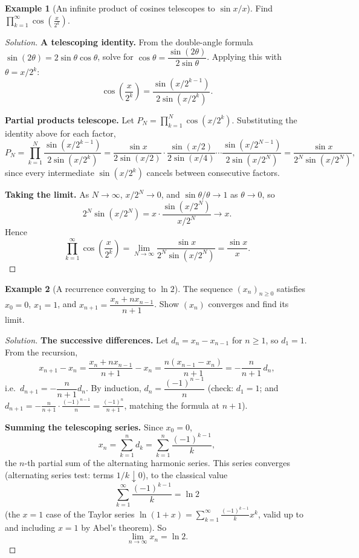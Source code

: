 \documentclass[11pt]{article}
\theoremstyle{definition}
\newtheorem{example}{Example}[section]
\begin{document}
\begin{example}[An infinite product of cosines telescopes to $\sin x/x$]
Find $\displaystyle\prod_{k=1}^\infty\cos\left(\frac x{2^k}\right)$.
\end{example}
\begin{proof}[Solution]
\textbf{A telescoping identity.} From the double-angle formula $\sin(2\theta)=2\sin\theta\cos\theta$, solve for $\cos\theta=\dfrac{\sin(2\theta)}{2\sin\theta}$. Applying this with $\theta=x/2^k$:
\[
\cos\!\left(\frac x{2^k}\right)=\frac{\sin(x/2^{k-1})}{2\sin(x/2^k)}.
\]

\textbf{Partial products telescope.} Let $P_N=\displaystyle\prod_{k=1}^N\cos(x/2^k)$. Substituting the identity above for each factor,
\[
P_N=\prod_{k=1}^N\frac{\sin(x/2^{k-1})}{2\sin(x/2^k)}=\frac{\sin x}{2\sin(x/2)}\cdot\frac{\sin(x/2)}{2\sin(x/4)}\cdots\frac{\sin(x/2^{N-1})}{2\sin(x/2^N)}=\frac{\sin x}{2^N\sin(x/2^N)},
\]
since every intermediate $\sin(x/2^{k})$ cancels between consecutive factors.

\textbf{Taking the limit.} As $N\to\infty$, $x/2^N\to0$, and $\sin\theta/\theta\to1$ as $\theta\to0$, so
\[
2^N\sin(x/2^N)=x\cdot\frac{\sin(x/2^N)}{x/2^N}\longrightarrow x.
\]
Hence
\[
\boxed{\prod_{k=1}^\infty\cos\!\left(\frac x{2^k}\right)=\lim_{N\to\infty}\frac{\sin x}{2^N\sin(x/2^N)}=\frac{\sin x}{x}}.
\]
\end{proof}

\begin{example}[A recurrence converging to $\ln 2$]
The sequence $(x_n)_{n\ge0}$ satisfies $x_0=0$, $x_1=1$, and $x_{n+1}=\dfrac{x_n+nx_{n-1}}{n+1}$. Show $(x_n)$ converges and find its limit.
\end{example}
\begin{proof}[Solution]
\textbf{The successive differences.} Let $d_n=x_n-x_{n-1}$ for $n\ge1$, so $d_1=1$. From the recursion,
\[
x_{n+1}-x_n=\frac{x_n+nx_{n-1}}{n+1}-x_n=\frac{n(x_{n-1}-x_n)}{n+1}=-\frac n{n+1}\,d_n,
\]
i.e.\ $d_{n+1}=-\dfrac n{n+1}d_n$. By induction, $d_n=\dfrac{(-1)^{n-1}}n$ (check: $d_1=1$; and $d_{n+1}=-\frac n{n+1}\cdot\frac{(-1)^{n-1}}n=\frac{(-1)^n}{n+1}$, matching the formula at $n+1$).

\textbf{Summing the telescoping series.} Since $x_0=0$,
\[
x_n=\sum_{k=1}^n d_k=\sum_{k=1}^n\frac{(-1)^{k-1}}k,
\]
the $n$-th partial sum of the alternating harmonic series. This series converges (alternating series test: terms $1/k\downarrow0$), to the classical value
\[
\sum_{k=1}^\infty\frac{(-1)^{k-1}}k=\ln2
\]
(the $x=1$ case of the Taylor series $\ln(1+x)=\sum_{k=1}^\infty\frac{(-1)^{k-1}}kx^k$, valid up to and including $x=1$ by Abel's theorem). So
\[
\boxed{\lim_{n\to\infty}x_n=\ln2}.
\]
\end{proof}
\end{document}
